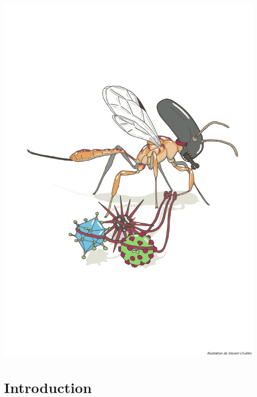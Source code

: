 \documentclass[a4paper,oneside,nobind]{thesis}
\begin{document}
    \begin{alwayssingle}
        \thispagestyle{empty}
        \begin{center}
            \includegraphics[valign=t,width=1\textwidth, page=1] {figures/preface3}
        \end{center}
        \restoregeometry
    \end{alwayssingle}
    
    \pagestyle{fancybook}

    \part{Introduction}

    \label{part:intro}
    
    
    
    
\end{document}
